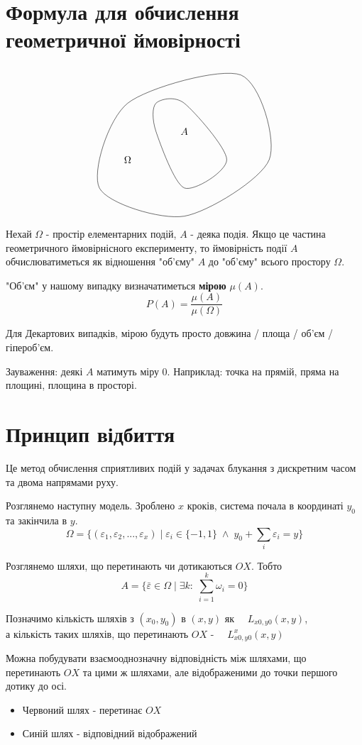 \documentclass[11pt, a4paper]{article} %
\begin{document}
\section*{Формула для обчислення геометричної ймовірності}
$$
\begin{tikzpicture}
    \draw plot [smooth cycle] coordinates {(-1,-1)(0,2)(4,3)(5,0)(2,-2)} node at (0,0) {$\Omega$};
    \draw plot [smooth cycle] coordinates {(1,1)(1,2)(2,2)(3.5,0)(2,-1)} node at (2,1) {$A$};
\end{tikzpicture}
$$
Нехай $\Omega$ - простір елементарних подій, $A$ - деяка подія. 
Якщо це частина геометричного ймовірнісного експерименту, то ймовірність
події $A$ обчислюватиметься як відношення "об'єму" $A$ до "об'єму" всього простору $\Omega$.

"Об'єм" у нашому випадку визначатиметься \textbf{мірою} $\mu(A)$.
$$
P(A) = \frac{\mu(A)}{\mu(\Omega)}
$$

Для Декартових випадків, мірою будуть просто довжина / площа / об'єм / гіпероб'єм. 
\begin{mdframed}
    Зауваження: деякі $A$ матимуть міру $0$. 
    Наприклад: точка на прямій, пряма на площині, площина в просторі.
\end{mdframed}


\section*{Принцип відбиття}
Це метод обчислення сприятливих подій у задачах блукання з дискретним часом та двома напрямами руху.

Розглянемо наступну модель. 
Зроблено $x$ кроків, система почала в координаті $y_0$ та закінчила в $y$.
$$\Omega = \{(\varepsilon_1, \varepsilon_2, ..., \varepsilon_x) \;|\; 
\varepsilon_i \in \{-1,1\} \;\wedge\; y_0 + \sum_i \varepsilon_i = y \}$$

Розглянемо шляхи, що перетинають чи дотикаються $OX$. Тобто
$$A = \{\bar{\varepsilon} \in \Omega \;|\; \exists k:\;\sum_{i=1}^k \omega_i = 0\}$$

Позначимо кількість шляхів з $(x_0, y_0)$ в $(x,y)$ як $\quad L_{x0,y0}(x,y)$,\\ 
а кількість таких шляхів, що перетинають $OX$ - $\quad L_{x0,y0}^x(x,y)$

\pagebreak
Можна побудувати взаємооднозначну відповідність між шляхами, що перетинають $OX$
та цими ж шляхами, але відображеними до точки першого дотику до осі.
\begin{itemize}
    \item Червоний шлях - перетинає $OX$
    \item Синій шлях - відповідний відображений
\end{itemize}
\end{document}
